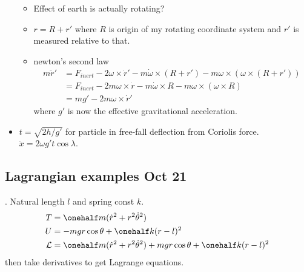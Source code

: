 \documentclass[10pt, twocolumn]{article}
\newcommand\p{\Needspace{10\baselineskip} \noindent}
\newcommand{\rdot}{\dot{r}}
\newcommand{\rddot}{\ddot{r}}
\begin{document}
\begin{itemize}
	\begin{itemize}
		\item Effect of earth is actually rotating?
		\item $r = R + r'$ where $R$ is origin of my rotating coordinate system and $r'$ is measured relative to that. 
		\item newton's second law
		\begin{align}
			m\rddot' &= F_{inert} - 2\omega \times \rdot' - m \dot{\omega }\times (R + r') - m \omega \times ( \omega \times (R + r')) \\
			&= F_{inert} - 2m \omega \times \rdot - m \dot{\omega} \times R - m \omega \times (\omega \times R) \\
			&= mg' - 2m\omega\times\dot{r}'
		\end{align}
		where $g'$ is now the effective gravitational acceleration. 
	\end{itemize}
	
	\item $t = \sqrt{2h/g'}$ for particle in free-fall deflection from Coriolis force. $\ddot{x} = 2\omega g' t\cos\lambda$. 
	
\end{itemize}



\newpage
\subsection{Lagrangian examples Oct 21}


\p {}. Natural length $l$ and spring const $k$. 
\begin{align}
	T &= \onehalf m (\rdot^2 + r^2 \dot{\theta}^2) \\
 U &= -mgr\cos\theta + \onehalf k (r - l)^2 \\
 \mathcal{L} &=  \onehalf m (\rdot^2 + r^2 \dot{\theta}^2) + mgr\cos\theta + \onehalf k (r - l)^2 
\end{align}
then take derivatives to get Lagrange equations. \\ \\
\end{document}
